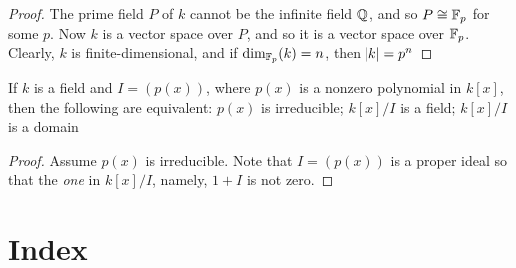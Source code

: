\documentclass[11pt]{article}
\begin{document}
\begin{proof}
The prime field \(P\) of \(k\) cannot be the infinite field \(\mathbb{Q}\), and so
\(P\cong\mathbb{F}_p\) for some \(p\). Now \(k\) is a  vector space over \(P\), and so it is
a vector space over \(\mathbb{F}_p\). Clearly, \(k\) is finite-dimensional, and if
\(\dim_{\mathbb{F}_p}(k)=n\), then \(\abs{k}=p^n\)
\end{proof}

\begin{proposition}[]
If \(k\) is a field and \(I=(p(x))\), where \(p(x)\) is a nonzero polynomial in
\(k[x]\), then the following are equivalent: \(p(x)\) is irreducible;
\(k[x]/I\) is a field; \(k[x]/I\) is a domain
\end{proposition}

\begin{proof}
Assume \(p(x)\) is irreducible. Note that \(I=(p(x))\) is a proper ideal so
that the \emph{one} in \(k[x]/I\), namely, \(1+I\) is not zero.
\end{proof}








\section{Index}
\label{sec:org88a5333}
\printindex
\end{document}
